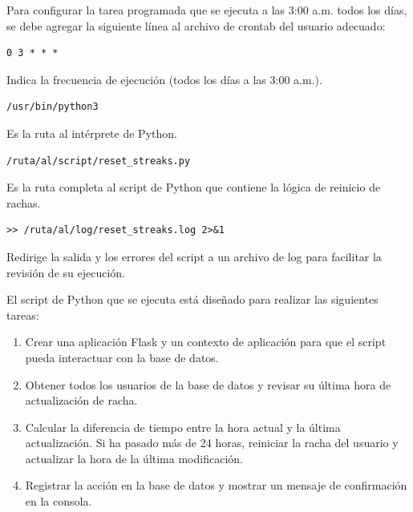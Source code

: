 Para configurar la tarea programada que se ejecuta a las 3:00 a.m. todos los días, se debe agregar la siguiente línea al archivo de crontab del usuario adecuado:


\begin{lstlisting}[caption={Frecuencia de ejecución}, label={lst:cron_frequency}]
0 3 * * *
\end{lstlisting}
\noindent
Indica la frecuencia de ejecución (todos los días a las 3:00 a.m.).

\begin{lstlisting}[caption={Ruta al intérprete de Python}, label={lst:python_path}]
/usr/bin/python3
\end{lstlisting}
\noindent
Es la ruta al intérprete de Python.

\begin{lstlisting}[caption={Ruta al script de Python}, label={lst:script_path}]
/ruta/al/script/reset_streaks.py
\end{lstlisting}
\noindent
Es la ruta completa al script de Python que contiene la lógica de reinicio de rachas.

\begin{lstlisting}[caption={Redirección de salida y errores}, label={lst:log_redirection}]
>> /ruta/al/log/reset_streaks.log 2>&1
\end{lstlisting}
\noindent
Redirige la salida y los errores del script a un archivo de log para facilitar la revisión de su ejecución.

El script de Python que se ejecuta está diseñado para realizar las siguientes tareas:
\begin{enumerate}
    \item Crear una aplicación Flask y un contexto de aplicación para que el script pueda interactuar con la base de datos.
    \item Obtener todos los usuarios de la base de datos y revisar su última hora de actualización de racha.
    \item Calcular la diferencia de tiempo entre la hora actual y la última actualización. Si ha pasado más de 24 horas, reiniciar la racha del usuario y actualizar la hora de la última modificación.
    \item Registrar la acción en la base de datos y mostrar un mensaje de confirmación en la consola.
\end{enumerate}

